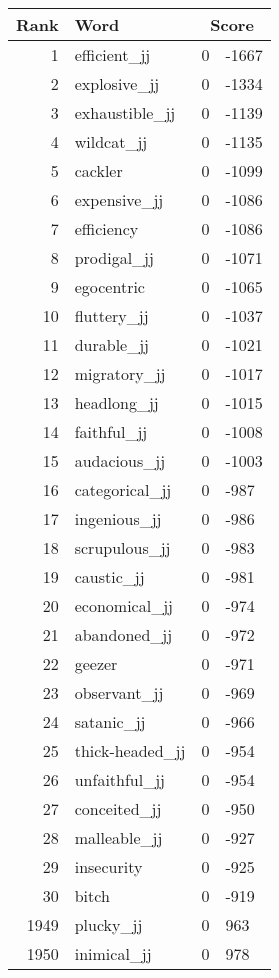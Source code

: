 \begin{longtable}[!htbp]{| rlr@{.}l |}
    \hline
    \textbf{Rank} & \textbf{Word} & \multicolumn{2}{c|}{\textbf{Score}} \\
    \hline
    \endhead
    1 & efficient\_jj & 0 & -1667 \\
    2 & explosive\_jj & 0 & -1334 \\
    3 & exhaustible\_jj & 0 & -1139 \\
    4 & wildcat\_jj & 0 & -1135 \\
    5 & cackler & 0 & -1099 \\
    6 & expensive\_jj & 0 & -1086 \\
    7 & efficiency & 0 & -1086 \\
    8 & prodigal\_jj & 0 & -1071 \\
    9 & egocentric & 0 & -1065 \\
    10 & fluttery\_jj & 0 & -1037 \\
    11 & durable\_jj & 0 & -1021 \\
    12 & migratory\_jj & 0 & -1017 \\
    13 & headlong\_jj & 0 & -1015 \\
    14 & faithful\_jj & 0 & -1008 \\
    15 & audacious\_jj & 0 & -1003 \\
    16 & categorical\_jj & 0 & -987 \\
    17 & ingenious\_jj & 0 & -986 \\
    18 & scrupulous\_jj & 0 & -983 \\
    19 & caustic\_jj & 0 & -981 \\
    20 & economical\_jj & 0 & -974 \\
    21 & abandoned\_jj & 0 & -972 \\
    22 & geezer & 0 & -971 \\
    23 & observant\_jj & 0 & -969 \\
    24 & satanic\_jj & 0 & -966 \\
    25 & thick-headed\_jj & 0 & -954 \\
    26 & unfaithful\_jj & 0 & -954 \\
    27 & conceited\_jj & 0 & -950 \\
    28 & malleable\_jj & 0 & -927 \\
    29 & insecurity & 0 & -925 \\
    30 & bitch & 0 & -919 \\
    1949 & plucky\_jj & 0 & 963 \\
    1950 & inimical\_jj & 0 & 978 \\

\end{longtable}
